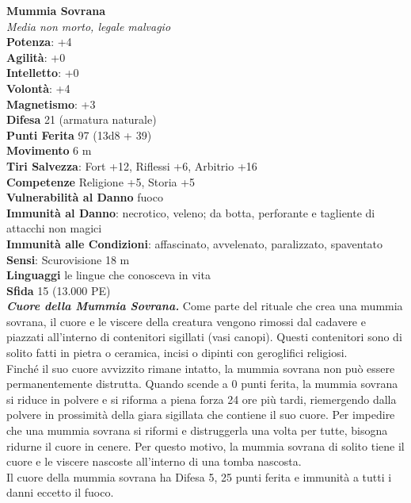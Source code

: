 \begin{multicols}{2}
\medskip\textbf{Mummia Sovrana}\\
\emph{Media non morto, legale malvagio}\\
\textbf{Potenza}: +4\\
\textbf{Agilità}: +0\\
\textbf{Intelletto}: +0\\
\textbf{Volontà}: +4\\
\textbf{Magnetismo}: +3\\
\textbf{Difesa} 21 (armatura naturale)\\
\textbf{Punti Ferita} 97 (13d8 + 39)\\
\textbf{Movimento} 6 m\\
\textbf{Tiri Salvezza}: Fort +12, Riflessi +6, Arbitrio +16\\
\textbf{Competenze} Religione +5, Storia +5\\
\textbf{Vulnerabilità al Danno} fuoco\\
\textbf{Immunità al Danno}: necrotico, veleno; da botta, perforante e tagliente di attacchi non magici\\
\textbf{Immunità alle Condizioni}: affascinato, avvelenato, paralizzato, spaventato\\
\textbf{Sensi}: Scurovisione 18 m\\
\textbf{Linguaggi} le lingue che conosceva in vita\\
\textbf{Sfida} 15 (13.000 PE)\smallskip\\

\emph{\textbf{Cuore della Mummia Sovrana.}} Come parte del rituale che crea una mummia sovrana, il cuore e le viscere della creatura vengono rimossi dal cadavere e piazzati all'interno di contenitori sigillati (vasi canopi). Questi contenitori sono di solito fatti in pietra o ceramica, incisi o dipinti con geroglifici religiosi.\\

Finché il suo cuore avvizzito rimane intatto, la mummia sovrana non può essere permanentemente distrutta. Quando scende a 0 punti ferita, la mummia sovrana si riduce in polvere e si riforma a piena forza 24 ore più tardi, riemergendo dalla polvere in prossimità della giara sigillata che contiene il suo cuore. Per impedire che una mummia sovrana si riformi e distruggerla una volta per tutte, bisogna ridurne il cuore in cenere. Per questo motivo, la mummia sovrana di solito tiene il cuore e le viscere nascoste all'interno di una tomba nascosta.\\
Il cuore della mummia sovrana ha Difesa 5, 25 punti ferita e immunità a tutti i danni eccetto il fuoco.


\end{multicols}
